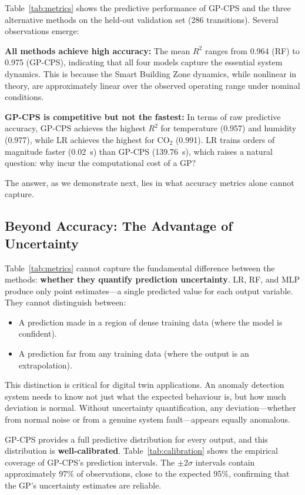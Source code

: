 \documentclass[conference]{IEEEtran}
\begin{document}
Table~\ref{tab:metrics} shows the predictive performance of GP-CPS and the three alternative methods on the held-out validation set (286 transitions). Several observations emerge:

\textbf{All methods achieve high accuracy:} The mean $R^2$ ranges from 0.964 (RF) to 0.975 (GP-CPS), indicating that all four models capture the essential system dynamics. This is because the Smart Building Zone dynamics, while nonlinear in theory, are approximately linear over the observed operating range under nominal conditions.

\textbf{GP-CPS is competitive but not the fastest:} In terms of raw predictive accuracy, GP-CPS achieves the highest $R^2$ for temperature (0.957) and humidity (0.977), while LR achieves the highest for CO$_2$ (0.991). LR trains orders of magnitude faster (0.02~s) than GP-CPS (139.76~s), which raises a natural question: why incur the computational cost of a GP?

The answer, as we demonstrate next, lies in what accuracy metrics alone cannot capture.

\subsection{Beyond Accuracy: The Advantage of Uncertainty}

Table~\ref{tab:metrics} cannot capture the fundamental difference between the methods: \textbf{whether they quantify prediction uncertainty}. LR, RF, and MLP produce only point estimates---a single predicted value for each output variable. They cannot distinguish between:
\begin{itemize}[nosep]
\item A prediction made in a region of dense training data (where the model is confident).
\item A prediction far from any training data (where the output is an extrapolation).
\end{itemize}

This distinction is critical for digital twin applications. An anomaly detection system needs to know not just what the expected behaviour is, but how much deviation is normal. Without uncertainty quantification, any deviation---whether from normal noise or from a genuine system fault---appears equally anomalous.

GP-CPS provides a full predictive distribution for every output, and this distribution is \textbf{well-calibrated}. Table~\ref{tab:calibration} shows the empirical coverage of GP-CPS's prediction intervals. The $\pm 2\sigma$ intervals contain approximately 97\% of observations, close to the expected 95\%, confirming that the GP's uncertainty estimates are reliable.
\end{document}
